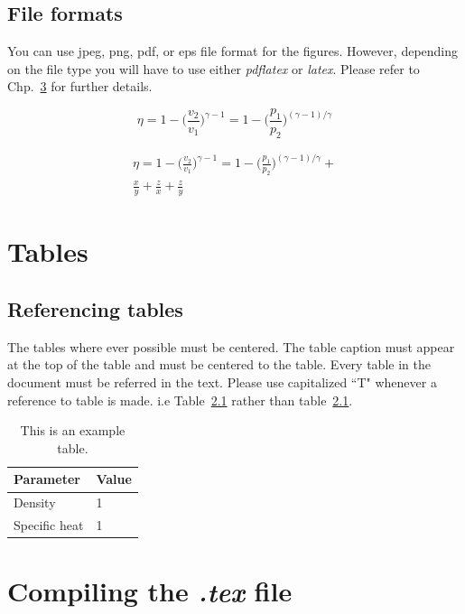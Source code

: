 \documentclass[a4paper,twoside]{iiththesis}
\begin{document}
\section{File formats}
You can use jpeg, png, pdf, or eps file format for the figures. However, depending on the file type you will have to use either \textit{pdflatex} or \textit{latex}. Please refer to Chp.~\ref{compiling} for further details.


\begin{equation}
\eta = 1-\bigg(\frac{v_2}{v_1}\bigg)^{\gamma-1} = 1-\bigg(\frac{p_1}{p_2}\bigg)^{(\gamma-1)/\gamma}
\end{equation}


\begin{flushright}
\begin{eqnarray}
 \eta = 1-\bigg(\frac{v_2}{v_1}\bigg)^{\gamma-1} = 1-\bigg(\frac{p_1}{p_2}\bigg)^{(\gamma-1)/\gamma} + \\ 
 \frac{x}{y} + \frac{z}{x} + \frac{z}{y}
\end{eqnarray}

\end{flushright}


\chapter{Tables}

\section{Referencing tables}
The tables where ever possible must be centered. The table caption must appear at the top of the table and must be centered to the table. Every table in the document must be referred in the text. Please use capitalized ``T" whenever a reference to table is made. i.e Table~\ref{extable} rather than table~\ref{extable}.
\begin{table}[h]
\centering
\caption{This is an example table.}
\begin{tabular}{l l}
\hline
Parameter & Value \\
\hline
Density & 1 \\
Specific heat & 1 \\
\hline
\end{tabular}
\label{extable}
\end{table}

\chapter{Compiling the \textit{.tex} file }
\label{compiling}
\end{document}
